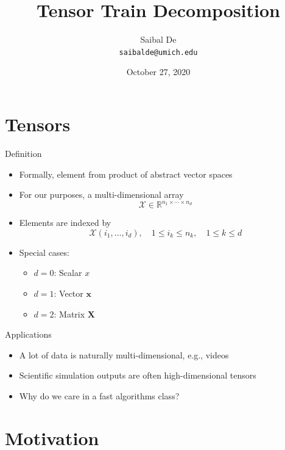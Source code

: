 \documentclass[aspectratio=169]{beamer}
\title{Tensor Train Decomposition}
\author[Saibal De]{Saibal De \\ \texttt{saibalde@umich.edu}}
\date{October 27, 2020}
\renewcommand{\Vec}[1]{\bm{#1}}
\newcommand{\Mat}[1]{\mathbf{#1}}
\newcommand{\Tns}[1]{\mathcal{#1}}
\newcommand{\RR}{\mathbb{R}}
\begin{document}
\begin{frame}
    \titlepage
\end{frame}

\section{Tensors}

\begin{frame}{Definition}
  \begin{itemize}
    \item
      Formally, element from product of abstract vector spaces
    \item
      For our purposes, a multi-dimensional array
      \begin{equation*}
        \Tns{X} \in \RR^{n_1 \times \cdots \times n_d}
      \end{equation*}
    \item
      Elements are indexed by
      \begin{equation*}
        \Tns{X}(i_1, \ldots, i_d), \quad 1 \leq i_k \leq n_k, \quad 1 \leq k
        \leq d
      \end{equation*}
    \item
      Special cases:
      \begin{itemize}
        \item
          $d = 0$: Scalar $x$
        \item
          $d = 1$: Vector $\Vec{x}$
        \item
          $d = 2$: Matrix $\Mat{X}$
      \end{itemize}
  \end{itemize}
\end{frame}

\begin{frame}{Applications}
  \begin{itemize}
    \item
      A lot of data is naturally multi-dimensional, e.g., videos
    \item
      Scientific simulation outputs are often high-dimensional tensors
    \item
      Why do we care in a fast algorithms class?
  \end{itemize}
\end{frame}

\section{Motivation}
\end{document}
